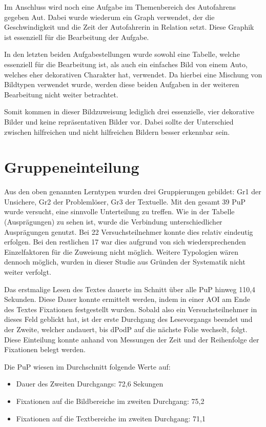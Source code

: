 Im Anschluss wird noch eine Aufgabe im Themenbereich des Autofahrens gegeben \gls{Aut}. Dabei wurde wiederum ein Graph verwendet, der die Geschwindigkeit und die Zeit der Autofahrerin in Relation setzt. Diese Graphik ist essenziell für die Bearbeitung der Aufgabe. 


In den letzten beiden Aufgabestellungen wurde sowohl eine Tabelle, welche essenziell für die Bearbeitung ist, als auch ein einfaches Bild von einem Auto, welches eher dekorativen Charakter hat, verwendet. Da hierbei eine Mischung von Bildtypen verwendet wurde, werden diese beiden Aufgaben in der weiteren Bearbeitung nicht weiter betrachtet. 

Somit kommen in dieser Bildzuweisung lediglich drei essenzielle, vier dekorative Bilder und keine repräsentativen Bilder vor. Dabei sollte der Unterschied zwischen hilfreichen und nicht hilfreichen Bildern besser erkennbar sein.


\section{Gruppeneinteilung}

Aus den oben genannten Lerntypen wurden drei Gruppierungen gebildet: \gls{Gr1} der Unsichere, \gls{Gr2} der Problemlöser, \gls{Gr3} der Textuelle. Mit den gesamt 39 \gls{PuP} wurde versucht, eine sinnvolle Unterteilung zu treffen. Wie in der Tabelle (Ausprägungen) zu sehen ist, wurde die Verbindung unterschiedlicher Ausprägungen genutzt. Bei 22 Versuchsteilnehmer konnte dies relativ eindeutig erfolgen. Bei den restlichen 17 war dies aufgrund von sich wiedersprechenden Einzelfaktoren für die Zuweisung nicht möglich. Weitere Typologien wären dennoch möglich, wurden in dieser Studie aus Gründen der Systematik nicht weiter verfolgt.

Das erstmalige Lesen des Textes dauerte im Schnitt über alle \gls{PuP} hinweg 110,4 Sekunden. Diese Dauer konnte ermittelt werden, indem in einer AOI am Ende des Textes Fixationen festgestellt wurden. Sobald also ein Versuchsteilnehmer in dieses Feld geblickt hat, ist der erste Durchgang des Lesevorgangs beendet und der Zweite, welcher andauert, bis \gls{dPodP} auf die nächste Folie wechselt, folgt. Diese Einteilung konnte anhand von Messungen der Zeit und der Reihenfolge der Fixationen belegt werden. 


Die \gls{PuP} wiesen im Durchschnitt folgende Werte auf:
    \begin{itemize}
        \item Dauer des Zweiten Durchgangs: 72,6 Sekungen 
        \item Fixationen auf die Bildbereiche im zweiten Durchgang: 75,2
        \item Fixationen auf die Textbereiche im zweiten Durchgang: 71,1
    \end{itemize}

